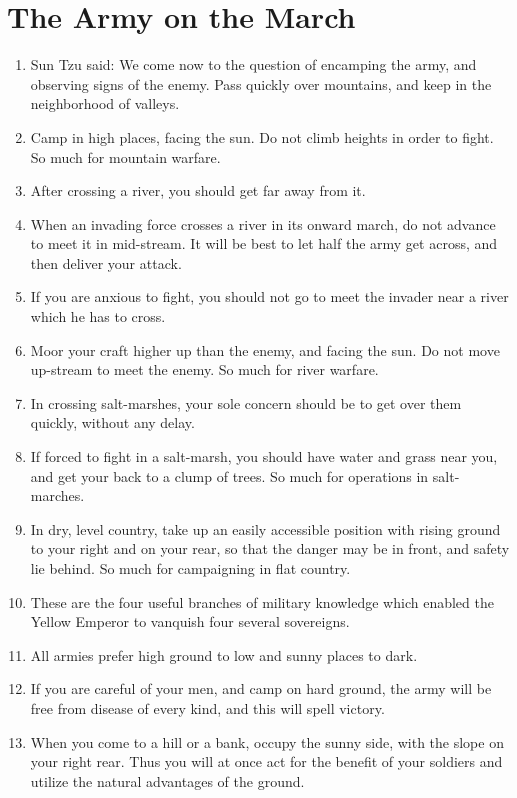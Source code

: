 \documentclass[oneside]{book}
\begin{document}
\chapter{The Army on the March}
\begin{enumerate}
	\item Sun Tzu said: We come now to the question of encamping the army, and observing signs of the enemy. Pass quickly over mountains, and keep in the neighborhood of valleys.
	\item Camp in high places, facing the sun. Do not climb heights in order to fight. So much for mountain warfare.
	\item After crossing a river, you should get far away from it.
	\item When an invading force crosses a river in its onward march, do not advance to meet it in mid-stream. It will be best to let half the army get across, and then deliver your attack.
	\item If you are anxious to fight, you should not go to meet the invader near a river which he has to cross.
	\item Moor your craft higher up than the enemy, and facing the sun. Do not move up-stream to meet the enemy. So much for river warfare.
	\item In crossing salt-marshes, your sole concern should be to get over them quickly, without any delay.
	\item If forced to fight in a salt-marsh, you should have water and grass near you, and get your back to a clump of trees. So much for operations in salt-marches.
	\item In dry, level country, take up an easily accessible position with rising ground to your right and on your rear, so that the danger may be in front, and safety lie behind. So much for campaigning in flat country.
	\item These are the four useful branches of military knowledge which enabled the Yellow Emperor to vanquish four several sovereigns.
	\item All armies prefer high ground to low and sunny places to dark.
	\item If you are careful of your men, and camp on hard ground, the army will be free from disease of every kind, and this will spell victory.
	\item When you come to a hill or a bank, occupy the sunny side, with the slope on your right rear. Thus you will at once act for the benefit of your soldiers and utilize the natural advantages of the ground.

\end{enumerate}
\end{document}
